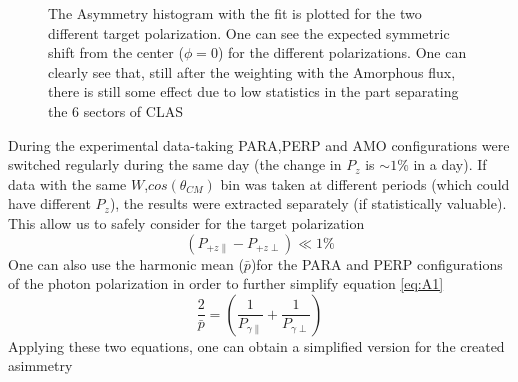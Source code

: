 \begin{figure}[H]
  \begin{center}
    \caption{The Asymmetry histogram with the fit is plotted for the two different target polarization. One can see the expected symmetric shift from the center ($\phi = 0$) for the different polarizations.  One can clearly see that, still after the weighting with the Amorphous flux, there is still some effect due to low statistics in the part separating the 6 sectors of CLAS}
    \label{fig:GTgpol}
  \end{center}
\end{figure} 
During the experimental data-taking PARA,PERP and AMO configurations were switched regularly during the same day (the change in $P_z$ is $\sim 1\%$ in a day). If data with the same $W$,$cos(\theta_{CM})$ bin was taken at different periods (which could have different $P_z$), the results were extracted separately (if statistically valuable). This allow us to safely consider for the target polarization
\begin{equation}
  (P_{+z\parallel}-P_{+z\perp}) \ll 1 \% 
\end{equation}
One can also use the harmonic mean ($\bar{p}$)for the PARA and PERP configurations of the photon polarization in order to further simplify equation \ref{eq:A1} 
\begin{equation}
  \frac{2}{\bar{p}} = \left(\frac{1}{P_{\gamma \parallel}} + \frac{1}{P_{\gamma \perp}}\right)
\end{equation}
Applying these two equations, one can obtain a simplified version for the created asimmetry
